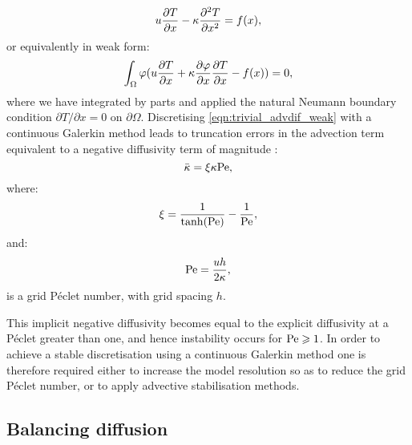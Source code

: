 \begin{equation}\label{eqn:trivial_advdif}
  u \frac{\partial T}{\partial x} - \kappa \frac{\partial^2T}{\partial x^2} = f(x),
\end{equation}
or equivalently in weak form:
\begin{equation}\label{eqn:trivial_advdif_weak}
  \int_\Omega \varphi (u \frac{\partial T}{\partial x} + \kappa \frac{\partial\varphi}{\partial x} \frac{\partial T}{\partial x} - f(x)) = 0,
\end{equation}
where we have integrated by parts and applied the natural Neumann boundary
condition $\partial T / \partial x = 0$ on $\partial \Omega$.
Discretising \eqref{eqn:trivial_advdif_weak} with a continuous Galerkin method
leads to truncation errors in the advection term equivalent to a negative
diffusivity term of magnitude \citep{DoneaBook}:
\begin{equation}\label{eqn:cg_implicit_diffusivity}
  \bar{\kappa} = \xi \kappa \mathrm{Pe},
\end{equation}
where:
\begin{equation}\label{eqn:xi_parameter}
  \xi = \frac{1}{\tanh(\mathrm{Pe})} - \frac{1}{\mathrm{Pe}},
\end{equation}
and:
\begin{equation}\label{eqn:grid_pe}
  \mathrm{Pe} = \frac{u h}{2 \kappa},
\end{equation}
is a grid P\'eclet number, with grid spacing $h$.

This implicit negative diffusivity becomes
equal to the explicit diffusivity at a P\'eclet greater than one, and hence
instability occurs for $\mathrm{Pe} \geqslant 1$. In order to achieve a stable discretisation
using a continuous Galerkin method one is therefore required either to increase
the model resolution so as to reduce the grid P\'eclet number, or to apply
advective stabilisation methods.

\subsection{Balancing diffusion}\label{sec:balancing_diffusion}

